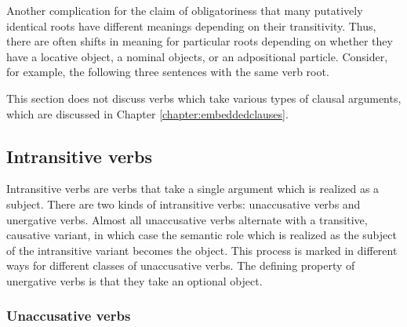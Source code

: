 Another complication for the claim of obligatoriness that many putatively identical roots have different meanings depending on their transitivity. Thus, there are often shifts in meaning for particular roots depending on whether they have a locative object, a nominal objects, or an adpositional particle. Consider, for example, the following three sentences with the same verb root.


%
%
%

This section does not discuss verbs which take various types of clausal arguments, which are discussed in Chapter \ref{chapter:embeddedclauses}.



\subsection{Intransitive verbs}\label{sec:ch12:intransitive}

Intransitive verbs are verbs that take a single argument which is realized as a subject. There are two kinds of intransitive verbs: unaccusative verbs and unergative verbs. Almost all unaccusative verbs alternate with a transitive, causative variant, in which case the semantic role which is realized as the subject of the intransitive variant becomes the object. This process is marked in different ways for different classes of unaccusative verbs. The defining property of unergative verbs is that they take an optional object.

\subsubsection{Unaccusative verbs}\label{sec:ch12:unaccusative} 

